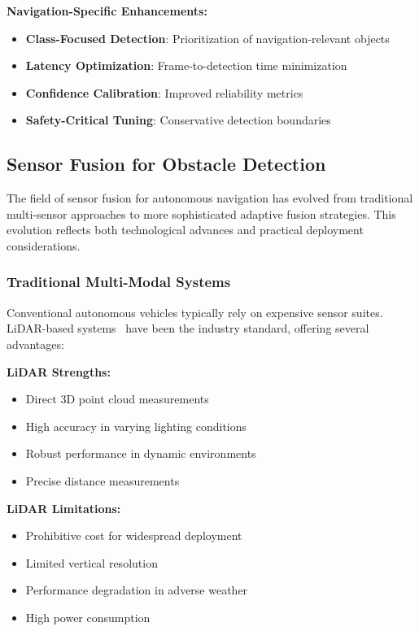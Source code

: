 \documentclass[12pt,oneside]{book}
\begin{document}
\textbf{Navigation-Specific Enhancements:}
\begin{itemize}
    \item \textbf{Class-Focused Detection}: Prioritization of navigation-relevant objects
    \item \textbf{Latency Optimization}: Frame-to-detection time minimization
    \item \textbf{Confidence Calibration}: Improved reliability metrics
    \item \textbf{Safety-Critical Tuning}: Conservative detection boundaries
\end{itemize}

\subsection{Sensor Fusion for Obstacle Detection}

The field of sensor fusion for autonomous navigation has evolved from traditional multi-sensor approaches to more sophisticated adaptive fusion strategies. This evolution reflects both technological advances and practical deployment considerations.

\subsubsection{Traditional Multi-Modal Systems}
Conventional autonomous vehicles typically rely on expensive sensor suites. LiDAR-based systems~\cite{geiger2012we} have been the industry standard, offering several advantages:

\textbf{LiDAR Strengths:}
\begin{itemize}
    \item Direct 3D point cloud measurements
    \item High accuracy in varying lighting conditions
    \item Robust performance in dynamic environments
    \item Precise distance measurements
\end{itemize}

\textbf{LiDAR Limitations:}
\begin{itemize}
    \item Prohibitive cost for widespread deployment
    \item Limited vertical resolution
    \item Performance degradation in adverse weather
    \item High power consumption
\end{itemize}
\end{document}
